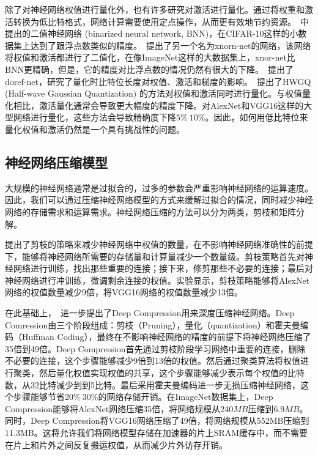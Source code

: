 除了对神经网络权值进行量化外，也有许多研究对激活进行量化。通过将权重和激活转换为低比特格式，网络计算需要使用定点操作，从而更有效地节约资源。~\citet{hubara2016binarized}中提出的二值神经网络 (binarized neural network, BNN)，在CIFAR-10这样的小数据集上达到了跟浮点数类似的精度。~\citet{rastegari2016xnor}提出了另一个名为xnorn-net的网络，该网络将权值和激活都进行了二值化，在像ImageNet这样的大数据集上，xnor-net比BNN更精确，但是，它的精度对比浮点数的情况仍然有很大的下降。~\citet{zhou2016dorefa}提出了doref-net，研究了量化时比特位长度对权值、激活和梯度的影响。~\citet{cai2017deep}提出了HWGQ (Half-wave Gaussian Quantization) 的方法对权值和激活同时进行量化。与权值量化相比，激活量化通常会导致更大幅度的精度下降。对AlexNet和VGG16这样的大型网络进行量化，这些方法会导致精确度下降$5\%  ~ 10\%$。因此，如何用低比特位来量化权值和激活仍然是一个具有挑战性的问题。


\subsection{神经网络压缩模型}
大规模的神经网络通常是过拟合的，过多的参数会严重影响神经网络的运算速度。因此，我们可以通过压缩神经网络模型的方式来缓解过拟合的情况，同时减少神经网络的存储需求和运算需求。神经网络压缩的方法可以分为两类，剪枝和矩阵分解。

\citet{han2015learning}提出了剪枝的策略来减少神经网络中权值的数量，在不影响神经网络准确性的前提下，能够将神经网络所需要的存储量和计算量减少一个数量级。剪枝策略首先对神经网络进行训练，找出那些重要的连接；接下来，修剪那些不必要的连接；最后对神经网络进行冲训练，微调剩余连接的权值。实验显示，剪枝策略能够将AlexNet网络的权值数量减少9倍，将VGG16网络的权值数量减少13倍。

在此基础上，~\citet{han2016eie}进一步提出了Deep Compression用来深度压缩神经网络。Deep Comression由三个阶段组成：剪枝（Pruning），量化（quantization）和霍夫曼编码（Huffman Coding），最终在不影响神经网络的精度的前提下将神经网络压缩了35倍到49倍。Deep Compression首先通过剪枝阶段学习网络中重要的连接，删除不必要的连接，这个步骤能够减少9倍到13倍的权值。然后通过聚类算法将权值进行聚类，然后量化权值实现权值的共享，这个步骤能够减少表示每个权值的比特数，从32比特减少到到5比特。最后采用霍夫曼编码进一步无损压缩神经网络，这个步骤能够节省$20\%~30\%$的网络存储开销。在ImageNet数据集上，Deep Compression能够将AlexNet网络压缩35倍，将网络规模从$240MB$压缩到$6.9MB$。同时，Deep Compression将VGG16网络压缩了49倍，将网络规模从552MB压缩到11.3MB。这将允许我们将网络模型存储在加速器的片上SRAM缓存中，而不需要在片上和片外之间反复搬运权值，从而减少片外访存开销。

